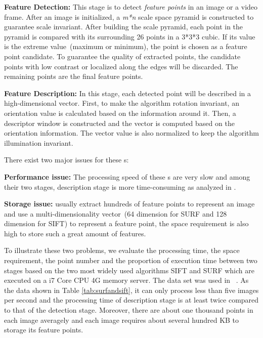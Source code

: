 \squishlist

\item \textbf{Feature Detection:} This stage is to detect \emph{feature points} in an image or a video frame. After an image is initialized, a \emph{m*n} scale space pyramid is constructed to guarantee scale invariant.  After building the scale pyramid, each point in the pyramid is compared with its surrounding 26 points in a 3*3*3 cubic. If its value is the extreme value~(maximum or minimum), the point is chosen as a feature point candidate. To guarantee the quality of extracted points, the candidate points with low contrast or localized along the edges will be discarded. The remaining points are the final feature points.

\item \textbf{Feature Description:} In this stage, each detected point will be described in a high-dimensional vector. First, to make the algorithm rotation invariant, an orientation value is calculated based on the information around it. Then, a descriptor window is constructed and the vector is computed based on the orientation information. The vector value is also normalized to keep the algorithm illumination invariant.
\squishend

There exist two major issues for these {\lfea}s:
\squishlist
\setlength{\itemsep}{0mm}

\item \textbf{Performance issue:} The processing speed of these {\lfea}s are very slow and among their two stages, description stage is more time-consuming as analyzed in \cite{chen2012adaptive}.

\item  \textbf{Storage issue:} {\lfea} usually extract hundreds of feature points to represent an image and use a multi-dimensionality vector~(64 dimension for SURF\cite{bay2006surf} and 128 dimension for SIFT\cite{lowe1999object, lowe2004distinctive}) to represent a feature point, the space requirement is also high to store such a great amount of features.

\squishend

To illustrate these two problems, we evaluate the processing time, the space requirement, the point number and the proportion of execution time between two stages based on the two most widely used algorithms SIFT and SURF which are executed on a i7 Core CPU 4G memory server. The data set was used in ~\cite{mikolajczyk2005performance}. As the data shown in Table \ref{tab:surfandsift}, it can only process less than five images per second and the processing time of description stage is at least twice compared to that of the detection stage. Moreover, there are about one thousand points in each image averagely and each image requires about several hundred KB to storage its feature points.


